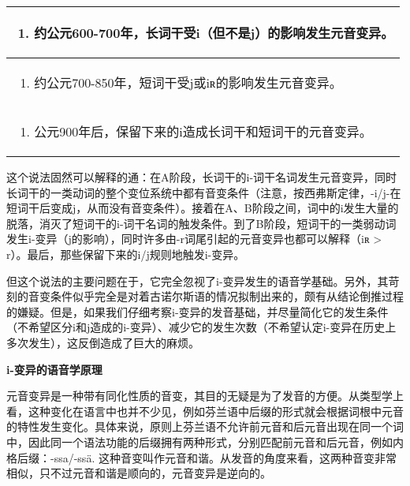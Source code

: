 {{\begin{longtable}{l}
  \toprule
  \begin{enumerate}\def\labelenumi{\Alph{enumi}.}\item  约公元600-700年，长词干受i（但不是j）的影响发生元音变异。\end{enumerate} \\
  \midrule
  \endhead
  \bottomrule
  \endfoot
  \begin{minipage}[t]{\linewidth}\raggedright
    \begin{enumerate}
      \def\labelenumi{\Alph{enumi}.}
      \setcounter{enumi}{1}
      \item
            约公元700-850年，短词干受j或iʀ的影响发生元音变异。
    \end{enumerate}
  \end{minipage}                                                                        \\
  \begin{minipage}[t]{\linewidth}\raggedright
    \begin{enumerate}
      \def\labelenumi{\Alph{enumi}.}
      \setcounter{enumi}{2}
      \item
            公元900年后，保留下来的i造成长词干和短词干的元音变异。
    \end{enumerate}
  \end{minipage}                                                                        \\
\end{longtable}

这个说法固然可以解释的通：在A阶段，长词干的i-词干名词发生元音变异，同时长词干的一类动词的整个变位系统中都有音变条件（注意，按西弗斯定律，-i/j-在短词干后变成j，从而没有音变条件）。接着在A、B阶段之间，词中的i发生大量的脱落，消灭了短词干的i-词干名词的触发条件。到了B阶段，短词干的一类弱动词发生i-变异（j的影响），同时许多由-r词尾引起的元音变异也都可以解释（iʀ
\textgreater{} r）。最后，那些保留下来的i/j规则地触发i-变异。

但这个说法的主要问题在于，它完全忽视了i-变异发生的语音学基础。另外，其苛刻的音变条件似乎完全是对着古诺尔斯语的情况拟制出来的，颇有从结论倒推过程的嫌疑。但是，如果我们仔细考察i-变异的发音基础，并尽量简化它的发生条件（不希望区分i和j造成的i-变异）、减少它的发生次数（不希望认定i-变异在历史上多次发生），这反倒造成了巨大的麻烦。

\textbf{i-变异的语音学原理}

元音变异是一种带有同化性质的音变，其目的无疑是为了发音的方便。从类型学上看，这种变化在语言中也并不少见，例如芬兰语中后缀的形式就会根据词根中元音的特性发生变化。具体来说，原则上芬兰语不允许前元音和后元音出现在同一个词中，因此同一个语法功能的后缀拥有两种形式，分别匹配前元音和后元音，例如内格后缀：-ssa/-ssä.
这种音变叫作元音和谐。从发音的角度来看，这两种音变非常相似，只不过元音和谐是顺向的，元音变异是逆向的。

}}
